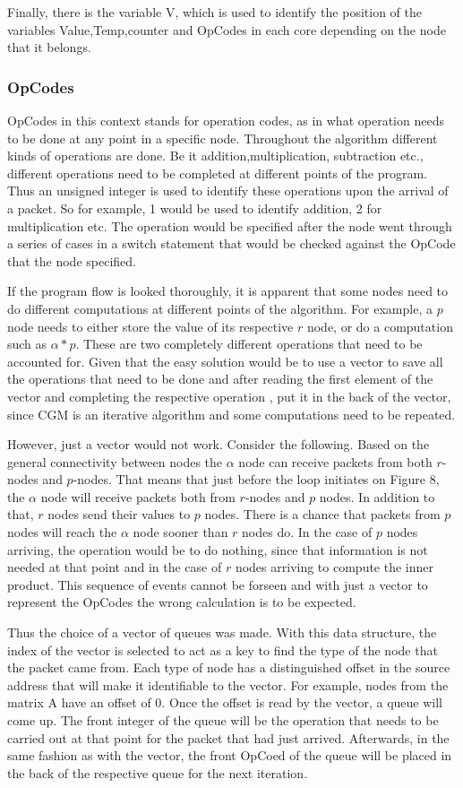 \documentclass[12pt,a4paper]{article}
\begin{document}
Finally, there is the variable V, which is used to identify the position of the variables Value,Temp,counter and OpCodes in each core depending on the node that it belongs.
\subsubsection{OpCodes}
OpCodes in this context stands for operation codes, as in what operation needs to be done at any point in a specific node. Throughout the algorithm different kinds of operations are done. Be it addition,multiplication, subtraction etc., different operations need to be completed at different points of the program. Thus an unsigned integer is used to identify these operations upon the arrival of a packet. So for example, 1 would be used to identify addition, 2 for multiplication etc. The operation would be specified after the node went through a series of cases in a switch statement that would be checked against the OpCode that the node specified.

If the program flow is looked thoroughly, it is apparent that some nodes need to do different computations at different points of the algorithm. For example, a $p$ node needs to either store the value of its respective $r$ node, or do a computation such as $\alpha *p$. These are two completely different operations that need to be accounted for. Given that the easy solution would be to use a vector to save all the operations that need to be done and after reading the first element of the vector and completing the respective operation , put it in the back of the vector, since CGM is an iterative algorithm and some computations need to be repeated.

However, just a vector would not work. Consider the following. Based on the general connectivity between nodes the $\alpha$ node can receive packets from both $r$-nodes and $p$-nodes. That means that just before the loop initiates on Figure 8, the $\alpha$ node will receive packets both from $r$-nodes and $p$ nodes. In addition to that, $r$ nodes send their values to $p$ nodes. There is a chance that packets from $p$ nodes will reach the $\alpha$ node sooner than $r$ nodes do. In the case of $p$ nodes arriving, the operation would be to do nothing, since that information is not needed at that point and in the case of $r$ nodes arriving to compute the inner product.  This sequence of events cannot be forseen and with just a vector to represent the OpCodes the wrong calculation is to be expected.

Thus the choice of a vector of queues was made. With this data structure, the index of the vector is selected to act as a key to find the type of the node that the packet came from. Each type of node has a distinguished offset in the source address that will make it identifiable to the vector. For example, nodes from the matrix A have an offset of 0. Once the offset is read by the vector, a queue will come up. The front integer of the queue will be the operation that needs to be carried out at that point for the packet that had just arrived. Afterwards, in the same fashion as with the vector, the front OpCoed of the queue will be placed in the back of the respective queue for the next iteration.
\end{document}
